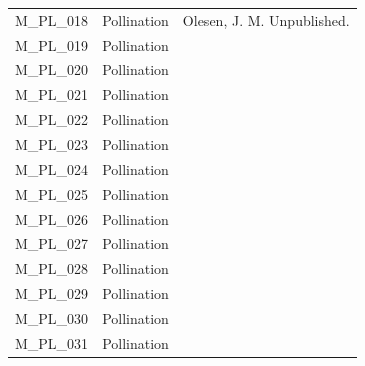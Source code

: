 \documentclass[12pt]{article}
\begin{document}
\begin{spacing}{1.0}
\begin{table}[!h]
\begin{center}
\begin{tabular}{|l l m{6cm} |}
    M\_PL\_018  & Pollination & Olesen, J. M. Unpublished.  \\
    M\_PL\_019  & Pollination & \citep{Inouye1988}  \\
    M\_PL\_020  & Pollination & \citep{Kevan1970} \\
    M\_PL\_021  & Pollination & \citep{Kato1999}  \\
    M\_PL\_022  & Pollination & \citep{Medan2002} \\
    M\_PL\_023  & Pollination & \citep{Medan2002} \\
    M\_PL\_024  & Pollination & \citep{Mosquin1967} \\
    M\_PL\_025  & Pollination & \citep{Motten1982}  \\
    M\_PL\_026  & Pollination & \citep{McMullen1993}  \\
    M\_PL\_027  & Pollination & \citep{Primack1983} \\
    M\_PL\_028  & Pollination & \citep{Primack1983} \\
    M\_PL\_029  & Pollination & \citep{Primack1983} \\
    M\_PL\_030  & Pollination & \citep{Ramirez1992} \\
    M\_PL\_031  & Pollination & \citep{Ramirez1989} \\
    \hline
    \end{tabular}
    \end{center}
    \end{table}

    \clearpage
    \newpage


\end{spacing}
\end{document}
